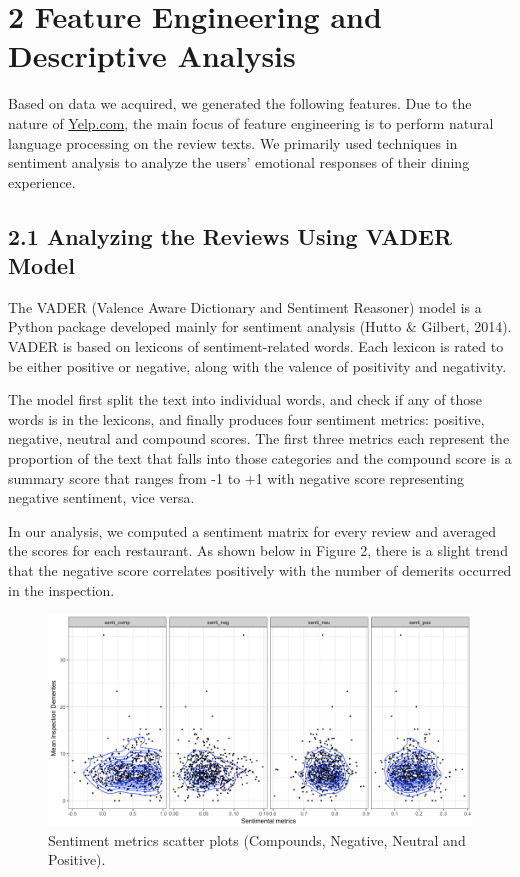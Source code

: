 \documentclass[letterpaper, 11 pt, conference]{ieeeconf}
\begin{document}
\section*{2 Feature Engineering and Descriptive Analysis}
Based on data we acquired, we generated the following features. Due to the nature of \url{Yelp.com}, the main focus of feature engineering is to perform natural language processing on the review texts. We primarily used techniques in sentiment analysis to analyze the users' emotional responses of their dining experience. 
\label{sec:theory}

\subsection*{2.1 Analyzing the Reviews Using VADER Model}
The VADER (Valence Aware Dictionary and Sentiment Reasoner) model is a Python package developed mainly for sentiment analysis (Hutto \& Gilbert, 2014). VADER is based on lexicons of sentiment-related words. Each lexicon is rated to be either positive or negative, along with the valence of positivity and negativity. 

The model first split the text into individual words, and check if any of those words is in the lexicons, and finally produces four sentiment metrics: positive, negative, neutral and compound scores. The first three metrics each represent the proportion of the text that falls into those categories and the compound score is a summary score that ranges from -1 to +1 with negative score representing negative sentiment, vice versa.

In our analysis, we computed a sentiment matrix for every review and averaged the scores for each restaurant. As shown below in Figure 2, there is a slight trend that the negative score correlates positively with the number of demerits occurred in the inspection. 

\begin{figure}[h]
	\centering
    \includegraphics[scale=0.23]{senti_analysis}
    \caption{Sentiment metrics scatter plots (Compounds, Negative, Neutral and Positive).}
\end{figure}
\end{document}
